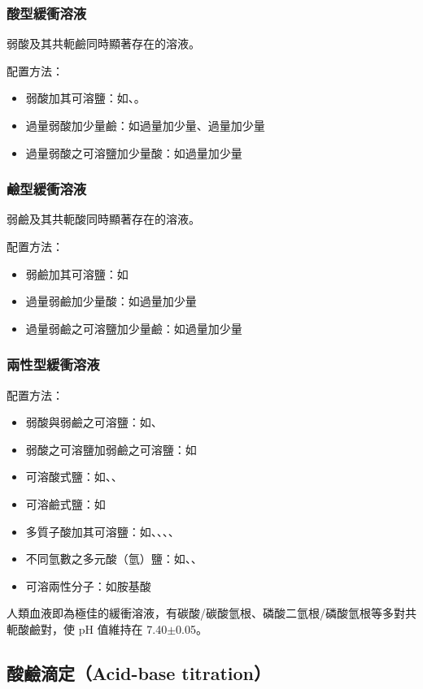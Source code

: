 \documentclass[a4paper,12pt]{article}
\begin{document}
\subsubsection{酸型緩衝溶液}
弱酸及其共軛鹼同時顯著存在的溶液。

配置方法：
\begin{itemize}
\item 弱酸加其可溶鹽：如、。
\item 過量弱酸加少量鹼：如過量加少量、過量加少量
\item 過量弱酸之可溶鹽加少量酸：如過量加少量
\end{itemize}
\subsubsection{鹼型緩衝溶液}
弱鹼及其共軛酸同時顯著存在的溶液。

配置方法：
\begin{itemize}
\item 弱鹼加其可溶鹽：如
\item 過量弱鹼加少量酸：如過量加少量
\item 過量弱鹼之可溶鹽加少量鹼：如過量加少量
\end{itemize}
\subsubsection{兩性型緩衝溶液}
配置方法：
\begin{itemize}
\item 弱酸與弱鹼之可溶鹽：如、
\item 弱酸之可溶鹽加弱鹼之可溶鹽：如
\item 可溶酸式鹽：如、、
\item 可溶鹼式鹽：如
\item 多質子酸加其可溶鹽：如、、、、
\item 不同氫數之多元酸（氫）鹽：如、、
\item 可溶兩性分子：如胺基酸
\end{itemize}
人類血液即為極佳的緩衝溶液，有碳酸/碳酸氫根、磷酸二氫根/磷酸氫根等多對共軛酸鹼對，使 pH 值維持在 7.40$\pm$0.05。
\subsection{酸鹼滴定（Acid-base titration）}
\end{document}
